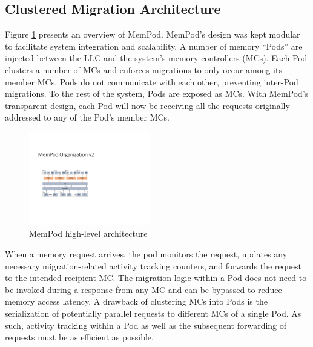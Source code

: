 \subsection{Clustered Migration Architecture}

 Figure \ref{fig:architecture_complete} presents an overview of MemPod. MemPod's design was kept modular to facilitate system integration and scalability. A number of memory ``Pods'' are injected between the LLC and the system's memory controllers (MCs). Each Pod clusters a number of MCs and enforces migrations to only occur among its member MCs. Pods do not communicate with each other, preventing inter-Pod migrations. To the rest of the system, Pods are exposed as MCs. With MemPod's transparent design, each Pod will now be receiving all the requests originally addressed to any of the Pod's member MCs. 
 
\begin{figure}
 \includegraphics[width=0.47\textwidth]{figures/mempod_org.pdf}
 \caption{MemPod high-level architecture}
 \label{fig:architecture_complete}
\end{figure}



When a memory request arrives, the pod monitors the request, updates any 
necessary migration-related activity tracking counters, and forwards 
the request to the intended recipient MC. The migration logic within a Pod does not need to be invoked during a response from any MC and can be bypassed to reduce memory access latency. A drawback of clustering MCs into Pods is the serialization of potentially parallel requests to different MCs of a single Pod. As such, activity tracking within a Pod as well as the subsequent forwarding of requests must be as efficient as possible. 

